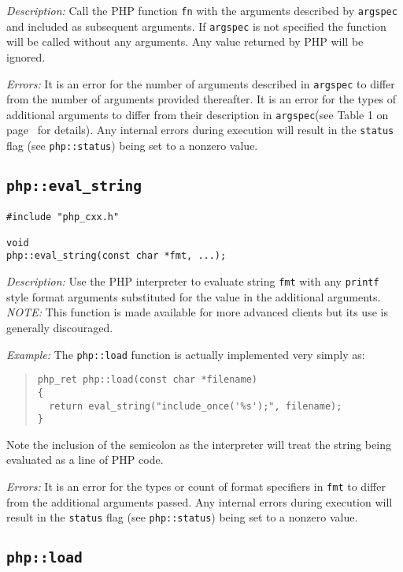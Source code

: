 \documentclass[11pt,titlepage]{article}
\begin{document}
\emph{Description:} Call the PHP function \verb|fn| with the arguments described by \verb|argspec| and included as subsequent arguments. If \verb|argspec| is not specified the function will be called without any arguments. Any value returned by PHP will be ignored.

\emph{Errors:} It is an error for the number of arguments described in \verb|argspec| to differ from the number of arguments provided thereafter. It is an error for the types of additional arguments to differ from their description in \verb|argspec|(see Table 1 on page~\pageref{Table1} for details). Any internal errors during execution will result in the \verb|status| flag (see \verb|php::status|) being set to a nonzero value.


\subsection{\texttt{php::eval\_string}}

\begin{verbatim}
#include "php_cxx.h"

void 
php::eval_string(const char *fmt, ...);
\end{verbatim}

\emph{Description:} Use the PHP interpreter to evaluate string \verb|fmt| with any \verb|printf| style format arguments substituted for the value in the additional arguments. \emph{NOTE:} This function is made available for more advanced clients but its use is generally discouraged.

\emph{Example:} The \verb|php::load| function is actually implemented very simply as:

\begin{quote}
\begin{verbatim}
php_ret php::load(const char *filename)
{   
  return eval_string("include_once('%s');", filename);
}  
\end{verbatim}
\end{quote}

Note the inclusion of the semicolon as the interpreter will treat the string being evaluated as a line of PHP code.

\emph{Errors:} It is an error for the types or count of format specifiers in \verb|fmt| to differ from the additional arguments passed. Any internal errors during execution will result in the \verb|status| flag (see \verb|php::status|) being set to a nonzero value.


\subsection{\texttt{php::load}}
\end{document}
